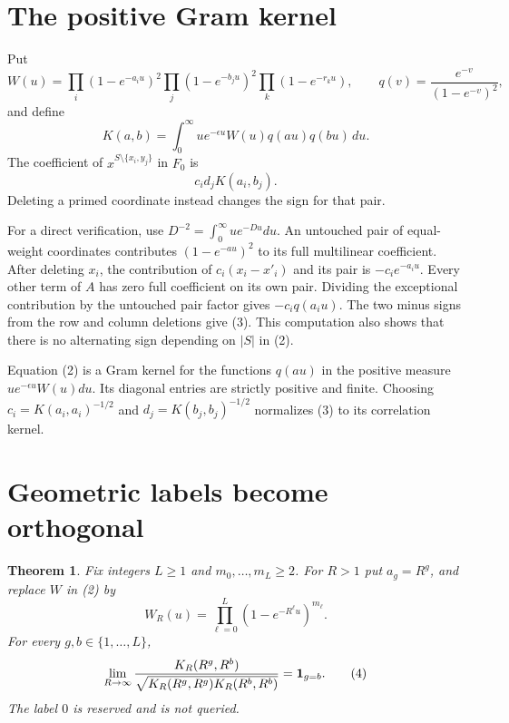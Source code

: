 \documentclass[11pt]{article}
\newtheorem{theorem}{Theorem}
\begin{document}
\section{The positive Gram kernel}

Put
\[
 W(u)=\prod_i(1-e^{-a_i u})^2
             \prod_j(1-e^{-b_j u})^2
             \prod_k(1-e^{-r_k u}),\qquad
 q(v)=\frac{e^{-v}}{(1-e^{-v})^2},
\]
and define
\[
 K(a,b)=\int_0^\infty u e^{-\epsilon u}
                         W(u)q(au)q(bu)\,du.        \tag{2}
\]
The coefficient of $x^{S\setminus\{x_i,y_j\}}$ in $F_0$ is
\[
                         c_i d_j K(a_i,b_j).        \tag{3}
\]
Deleting a primed coordinate instead changes the sign for that pair.

For a direct verification, use $D^{-2}=\int_0^\infty u e^{-Du}du$.
An untouched pair of equal-weight coordinates contributes
$(1-e^{-au})^2$ to its full multilinear coefficient. After deleting
$x_i$, the contribution of $c_i(x_i-x'_i)$ and its pair is
$-c_i e^{-a_i u}$. Every other term of $A$ has zero full coefficient
on its own pair. Dividing the exceptional contribution by the
untouched pair factor gives $-c_iq(a_i u)$. The two minus signs from
the row and column deletions give (3). This computation also shows
that there is no alternating sign depending on $|S|$ in (2).

Equation (2) is a Gram kernel for the functions $q(au)$ in the
positive measure $u e^{-\epsilon u}W(u)du$. Its diagonal entries are
strictly positive and finite. Choosing
$c_i=K(a_i,a_i)^{-1/2}$ and $d_j=K(b_j,b_j)^{-1/2}$ normalizes (3)
to its correlation kernel.

\section{Geometric labels become orthogonal}

\begin{theorem}\label{thm:orthogonal}
Fix integers $L\ge1$ and $m_0,\ldots,m_L\ge2$. For $R>1$ put
$a_g=R^g$, and replace $W$ in (2) by
\[
                  W_R(u)=\prod_{\ell=0}^L
                                  (1-e^{-R^\ell u})^{m_\ell}.
\]
For every $g,b\in\{1,\ldots,L\}$,
\[
 \lim_{R\to\infty}
 \frac{K_R(R^g,R^b)}
 {\sqrt{K_R(R^g,R^g)K_R(R^b,R^b)}}
                       ={\bf1}_{g=b}.              \tag{4}
\]
The label $0$ is reserved and is not queried.
\end{theorem}
\end{document}
